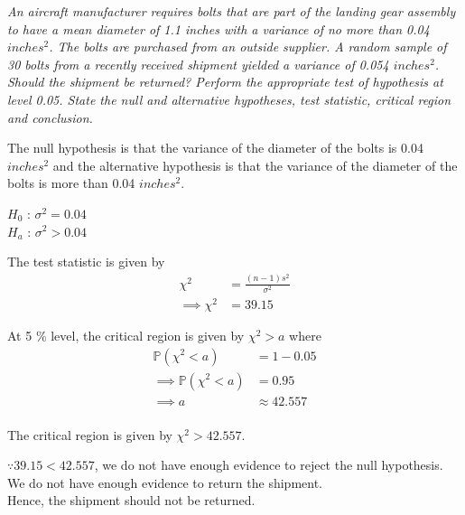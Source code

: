 \documentclass[12pt,letterpaper]{article}
\begin{document}
\textit{An aircraft manufacturer requires bolts that are part of the landing gear assembly to have a mean diameter of 1.1 inches with a variance of no more than 0.04 $inches^2$. The bolts are purchased from an outside supplier. A random sample of 30 bolts from a recently received shipment yielded a variance of 0.054 $inches^2$. Should the shipment be returned? Perform the appropriate test of hypothesis at level 0.05. State the null and alternative hypotheses, test statistic, critical region and conclusion.}
\vspace{2em}

The null hypothesis is that the variance of the diameter of the bolts is 0.04 $inches^2$ and the alternative hypothesis is that the variance of the diameter of the bolts is more than 0.04 $inches^2$.

$H_0$ : $\sigma^2 = 0.04$\\
$H_a$ : $\sigma^2 > 0.04$


The test statistic is given by
\begin{equation}
  \begin{split}
    \chi^2 &= \frac{(n-1)s^2}{\sigma^2}\\
    \implies \chi^2 &= 39.15
  \end{split}
\end{equation}


At 5 \% level, the critical region is given by $\chi^2 > a$ where
\begin{equation}
  \begin{split}
    \mathbb{P}(\chi^2 < a) &= 1 - 0.05\\
    \implies \mathbb{P}(\chi^2 < a) &= 0.95\\
    \implies a &\approx 42.557\\
  \end{split}
\end{equation}

The critical region is given by $\chi^2 > 42.557$.

$\because 39.15 < 42.557$, we do not have enough evidence to reject the null hypothesis.\\
We do not have enough evidence to return the shipment.\\
Hence, the shipment should not be returned.
\newpage

\end{document}
